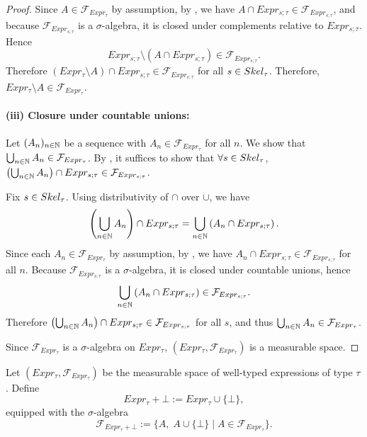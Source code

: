 \begin{proof}
	Since $A \in \mathcal{F}_{Expr_\tau}$ by assumption, by , we have $A \cap Expr_{s;\tau} \in \mathcal{F}_{Expr_{s;\tau}}$, and because $\mathcal{F}_{Expr_{s;\tau}}$ is a $\sigma$-algebra, it is closed under complements relative to $Expr_{s;\tau}$. Hence
	\[
		Expr_{s;\tau} \setminus (A \cap Expr_{s;\tau}) \in \mathcal{F}_{Expr_{s;\tau}}.
	\]
	Therefore $(Expr_\tau \setminus A) \cap Expr_{s;\tau} \in \mathcal{F}_{Expr_{s;\tau}}$ for all $s \in Skel_{\tau}$. Therefore, $Expr_\tau \setminus A \in \mathcal{F}_{Expr_\tau}$.

	\paragraph{(iii) Closure under countable unions:}

	Let $(A_n)_{n \in \mathbb{N}}$ be a sequence with $A_n \in \mathcal{F}_{Expr_\tau}$ for all $n$. We show that $\bigcup_{n \in \mathbb{N}} A_n \in \mathcal{F}_{Expr_\tau}$. By , it suffices to show that $\forall s \in Skel_\tau$,
	$\left(\bigcup_{n \in \mathbb{N}} A_n\right) \cap Expr_{s;\tau} \in \mathcal{F}_{Expr_{s;\tau}}$.
	
	Fix $s \in Skel_\tau$. Using distributivity of $\cap$ over $\cup$, we have
	\[
		\left(\bigcup_{n \in \mathbb{N}} A_n\right) \cap Expr_{s;\tau}
		=
		\bigcup_{n \in \mathbb{N}} \left(A_n \cap Expr_{s;\tau}\right).
	\]
	Since each $A_n \in \mathcal{F}_{Expr_\tau}$ by assumption, by , we have $A_n \cap Expr_{s;\tau} \in \mathcal{F}_{Expr_{s;\tau}}$ for all $n$. Because $\mathcal{F}_{Expr_{s;\tau}}$ is a $\sigma$-algebra, it is closed under countable unions, hence
	\[
		\bigcup_{n \in \mathbb{N}} \left(A_n \cap Expr_{s;\tau}\right) \in \mathcal{F}_{Expr_{s;\tau}}.
	\]
	Therefore $\left(\bigcup_{n \in \mathbb{N}} A_n\right) \cap Expr_{s;\tau} \in \mathcal{F}_{Expr_{s;\tau}}$ for all $s$, and thus $\bigcup_{n \in \mathbb{N}} A_n \in \mathcal{F}_{Expr_\tau}$.

	\medskip
	Since $\mathcal{F}_{Expr_{\tau}}$ is a $\sigma$-algebra on $Expr_{\tau}$, $(Expr_{\tau}, \mathcal{F}_{Expr_{\tau}})$ is a measurable space.
\end{proof}


\begin{definition}\label{def:meas-space-with-error}
	Let $(Expr_\tau,\mathcal F_{Expr_\tau})$ be the measurable space of well-typed
	expressions of type $\tau$. Define
	\[
	Expr_\tau + \bot := Expr_\tau \cup \{\bot\},
	\]
	equipped with the $\sigma$-algebra
	\[
	\mathcal F_{Expr_\tau+\bot}
	:=
	\{A,\; A\cup\{\bot\} \mid A\in \mathcal F_{Expr_\tau}\}.
	\]
\end{definition}

